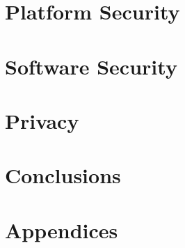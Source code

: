 \documentclass[
letterpaper, %
oneside,
nobib
]{tufte-book}
\begin{document}
\part{Platform Security} 






\part{Software Security}

 




\part{Privacy}



\part{Conclusions}



\appendix
\part{Appendices}


\backmatter

\printbibliography
\end{document}
